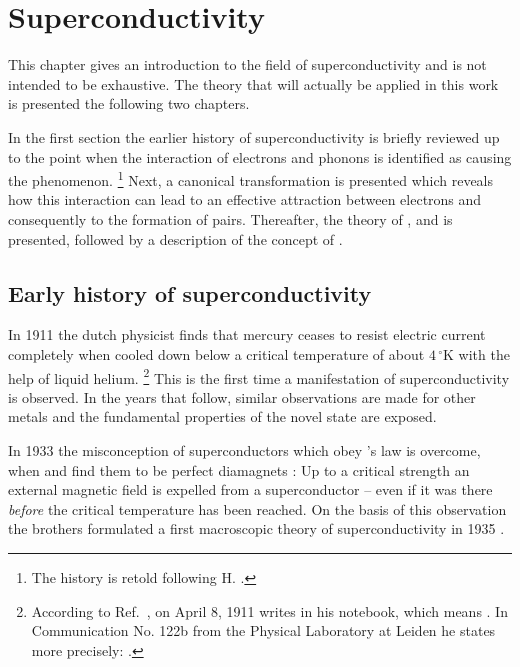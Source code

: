 
\chapter{Superconductivity}

This chapter gives an introduction to the field of superconductivity and is not
intended to be exhaustive. The theory that will actually be applied in this work
is presented the following two chapters.

In the first section the earlier history of superconductivity is briefly
reviewed up to the point when the interaction of electrons and phonons is
identified as causing the phenomenon.%
%
\footnote{The history is retold following H. 
\cite{Froehlich82}.}
%
Next, a canonical transformation is presented which reveals how this interaction
can lead to an effective attraction between electrons and consequently to the
formation of  pairs. Thereafter, the theory of ,
 and  is presented, followed by a description of
the concept of .

\section{Early history of superconductivity}

In 1911 the dutch physicist  finds that mercury ceases to
resist electric current completely when cooled down below a critical temperature
of about $4\,^\circ \mathrm K$ with the help of liquid helium.%
%
\footnote{According to Ref.~, on April 8, 1911
 writes  in his notebook, which
means . In Communication No. 122b
from the Physical Laboratory at Leiden he states more precisely: 
\cite{KamerlinghOnnes11}.}
%
This is the first time a manifestation of superconductivity is observed. In the
years that follow, similar observations are made for other metals and the
fundamental properties of the novel state are exposed.

In 1933 the misconception of superconductors which obey 's law is
overcome, when  and  find them to be perfect
diamagnets \cite{MeissnerOchsenfeld33}: Up to a critical strength an external
magnetic field is expelled from a superconductor -- even if it was there
\emph{before} the critical temperature has been reached. On the basis of this
observation the  brothers formulated a first macroscopic theory
of superconductivity in 1935 \cite{LondonLondon35}.

